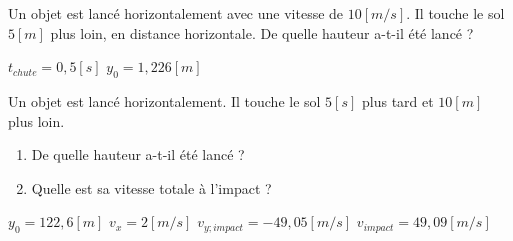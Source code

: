\begin{exercise}
    Un objet est lancé horizontalement avec une vitesse de \(10\unit{[m/s]}\). Il touche le sol \(5[m]\) plus loin, en distance horizontale. De quelle hauteur a-t-il été lancé ?
\end{exercise}
\begin{solution}
    \(t_{chute}=0,5\unit{[s]}\)
    \(y_0=1,226[m]\)
\end{solution}

\begin{exercise}
    Un objet est lancé horizontalement. Il touche le sol \(5\unit{[s]}\) plus tard et \(10[m]\) plus loin.
    \begin{enumerate}[label=\alph*)]
        \item De quelle hauteur a-t-il été lancé ?
        \item Quelle est sa vitesse totale à l'impact ?
    \end{enumerate}
\end{exercise}
\begin{solution}
    \(y_0=122,6[m]\)
    \(v_x=2\unit{[m/s]}\)
    \(v_{y;impact}=-49,05\unit{[m/s]}\)
    \(v_{impact}=49,09\unit{[m/s]}\)
\end{solution}

